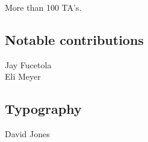 More than 100 TA's.

\subsection*{Notable contributions}

Jay Fucetola\\
Eli Meyer

\subsection*{Typography}

David Jones\\

\endinput
